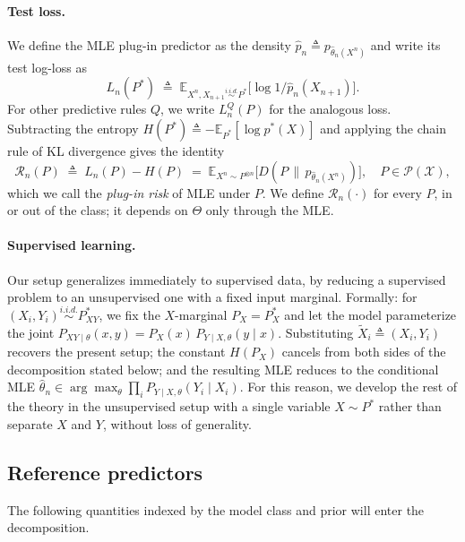 \paragraph{Test loss.}
We define the MLE plug-in predictor as the density
$\hat p_n\triangleq p_{\hat\theta_n(X^n)}$ and write its test log-loss as
\begin{equation}
L_n(P^*) \;\triangleq\; \mathbb{E}_{X^n,X_{n+1}\stackrel{\textit{i.i.d.}}{\sim}P^*}\!\big[\log 1/\hat p_n(X_{n+1})\big].
\label{eq:testloss}
\end{equation}
For other predictive rules $Q$, we write $L^Q_n(P)$ for the analogous loss.
Subtracting the entropy $H(P^*)\triangleq-\mathbb{E}_{P^*}[\log p^*(X)]$ and applying
the chain rule of KL divergence gives the identity
\begin{equation}
\mathcal{R}_n(P) \;\triangleq\; L_n(P)-H(P)
\;=\; \mathbb{E}_{X^n\sim P^{\otimes n}}\!\Big[D\!\left(P\,\big\|\,p_{\hat\theta_n(X^n)}\right)\Big],
\quad P\in\mathcal{P}(\mathcal{X}),
\label{eq:plugin-risk}
\end{equation}
which we call the \emph{plug-in risk} of MLE under $P$. We define
$\mathcal{R}_n(\cdot)$ for every $P$, in or out of the class; it depends on
$\Theta$ only through the MLE.

\paragraph{Supervised learning.}
Our setup generalizes immediately to supervised data, by reducing a supervised
problem to an unsupervised one with a fixed input marginal. Formally:
for $(X_i,Y_i)\stackrel{\textit{i.i.d.}}{\sim}P^*_{XY}$, we fix the
$X$-marginal $P_X=P_X^*$ and let the model
parameterize the joint
$P_{XY\mid\theta}(x,y)=P_X(x)\,P_{Y\mid X,\theta}(y\mid x)$. Substituting
$\tilde X_i\triangleq(X_i,Y_i)$ recovers the present setup; the constant
$H(P_X)$ cancels from both sides of the decomposition stated below; and the
resulting MLE reduces to the conditional MLE
$\hat\theta_n\in\arg\max_\theta\prod_i P_{Y\mid X,\theta}(Y_i\mid X_i)$.
For this reason, we develop the rest of the theory in the unsupervised setup
with a single variable $X\sim P^*$ rather than separate $X$ and $Y$, without
loss of generality.

\subsection{Reference predictors}
\label{sec:refobj}

The following quantities indexed by the model class and prior will enter the decomposition.

